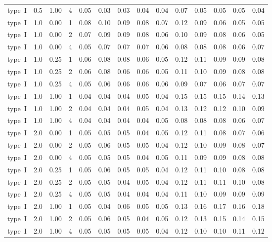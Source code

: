 \begin{table}[H]
\begin{tabular}{lrrrrrrrrrrrrr}
type~I & 0.5 & 1.00 & 4 & 0.05 & 0.03 & 0.03 & 0.04 & 0.04 & 0.07 & 0.05 & 0.05 & 0.05 & 0.04\\
type~I & 1.0 & 0.00 & 1 & 0.08 & 0.10 & 0.09 & 0.08 & 0.07 & 0.12 & 0.09 & 0.06 & 0.05 & 0.05\\
type~I & 1.0 & 0.00 & 2 & 0.07 & 0.09 & 0.09 & 0.08 & 0.06 & 0.10 & 0.09 & 0.08 & 0.06 & 0.05\\
type~I & 1.0 & 0.00 & 4 & 0.05 & 0.07 & 0.07 & 0.07 & 0.06 & 0.08 & 0.08 & 0.08 & 0.06 & 0.07\\
type~I & 1.0 & 0.25 & 1 & 0.06 & 0.08 & 0.08 & 0.06 & 0.05 & 0.12 & 0.11 & 0.09 & 0.09 & 0.08\\
type~I & 1.0 & 0.25 & 2 & 0.06 & 0.08 & 0.06 & 0.06 & 0.05 & 0.11 & 0.10 & 0.09 & 0.08 & 0.08\\
type~I & 1.0 & 0.25 & 4 & 0.05 & 0.06 & 0.06 & 0.06 & 0.06 & 0.09 & 0.07 & 0.06 & 0.07 & 0.07\\
type~I & 1.0 & 1.00 & 1 & 0.04 & 0.04 & 0.04 & 0.05 & 0.04 & 0.15 & 0.15 & 0.15 & 0.14 & 0.13\\
type~I & 1.0 & 1.00 & 2 & 0.04 & 0.04 & 0.04 & 0.05 & 0.04 & 0.13 & 0.12 & 0.12 & 0.10 & 0.09\\
type~I & 1.0 & 1.00 & 4 & 0.04 & 0.04 & 0.04 & 0.04 & 0.05 & 0.08 & 0.08 & 0.08 & 0.06 & 0.07\\
type~I & 2.0 & 0.00 & 1 & 0.05 & 0.05 & 0.05 & 0.04 & 0.05 & 0.12 & 0.11 & 0.08 & 0.07 & 0.06\\
type~I & 2.0 & 0.00 & 2 & 0.05 & 0.06 & 0.05 & 0.05 & 0.04 & 0.12 & 0.10 & 0.09 & 0.08 & 0.07\\
type~I & 2.0 & 0.00 & 4 & 0.05 & 0.05 & 0.05 & 0.04 & 0.05 & 0.11 & 0.09 & 0.09 & 0.08 & 0.08\\
type~I & 2.0 & 0.25 & 1 & 0.05 & 0.06 & 0.05 & 0.05 & 0.04 & 0.12 & 0.11 & 0.10 & 0.08 & 0.08\\
type~I & 2.0 & 0.25 & 2 & 0.05 & 0.05 & 0.04 & 0.05 & 0.04 & 0.12 & 0.11 & 0.11 & 0.10 & 0.08\\
type~I & 2.0 & 0.25 & 4 & 0.05 & 0.05 & 0.04 & 0.04 & 0.04 & 0.11 & 0.10 & 0.09 & 0.09 & 0.09\\
type~I & 2.0 & 1.00 & 1 & 0.05 & 0.04 & 0.06 & 0.05 & 0.05 & 0.13 & 0.16 & 0.17 & 0.16 & 0.18\\
type~I & 2.0 & 1.00 & 2 & 0.05 & 0.06 & 0.05 & 0.04 & 0.05 & 0.12 & 0.13 & 0.15 & 0.14 & 0.15\\
type~I & 2.0 & 1.00 & 4 & 0.05 & 0.05 & 0.05 & 0.05 & 0.04 & 0.12 & 0.10 & 0.10 & 0.11 & 0.12\\
\bottomrule
\end{tabular}
\endgroup{}
\end{table}
